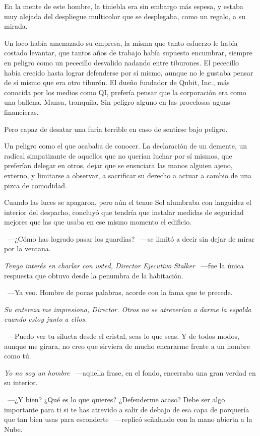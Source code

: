 En la mente de este hombre, la tiniebla era sin embargo más espesa, y estaba muy alejada del despliegue multicolor que se desplegaba, como un regalo, a su mirada.

Un loco había amenazado su empresa, la misma que tanto esfuerzo le había costado levantar, que tantos años de trabajo había supuesto encumbrar, siempre en peligro como un pececillo desvalido nadando entre tiburones. El pececillo había crecido hasta lograr defenderse por sí mismo, aunque no le gustaba pensar de sí mismo que era otro tiburón. El dueño fundador de Qubit, Inc., más conocida por los medios como QI, prefería pensar que la corporación era como una ballena. Mansa, tranquila. Sin peligro alguno en las procelosas aguas financieras.

Pero capaz de desatar una furia terrible en caso de sentirse bajo peligro.

Un peligro como el que acababa de conocer. La declaración de un demente, un radical simpatizante de aquellos que no querían luchar por sí mismos, que preferían delegar en otros, dejar que se ensuciara las manos alguien ajeno, externo, y limitarse a observar, a sacrificar su derecho a actuar a cambio de una pizca de comodidad.

Cuando las luces se apagaron, pero aún el tenue Sol alumbraba con languidez el interior del despacho, concluyó que tendría que instalar medidas de seguridad mejores que las que usaba en ese mismo momento el edificio.

~---¿Cómo has logrado pasar los guardias? ~---se limitó a decir sin dejar de mirar por la ventana.

\emph{Tengo interés en charlar con usted, Director Ejecutivo Stalker} ~---fue la única respuesta que obtuvo desde la penumbra de la habitación.

~---Ya veo. Hombre de pocas palabras, acorde con la fama que te precede.

\emph{Su entereza me impresiona, Director. Otros no se atreverían a darme la espalda cuando estoy junto a ellos.}

~---Puedo ver tu silueta desde el cristal, seas lo que seas. Y de todos modos, aunque me girara, no creo que sirviera de mucho encararme frente a un hombre como tú.

\emph{Yo no soy un hombre} ~---aquella frase, en el fondo, encerraba una gran verdad en su interior.

~---¿Y bien? ¿Qué es lo que quieres? ¿Defenderme acaso? Debe ser algo importante para ti si te has atrevido a salir de debajo de esa capa de porquería que tan bien usas para esconderte ~---replicó señalando con la mano abierta a la Nube.

